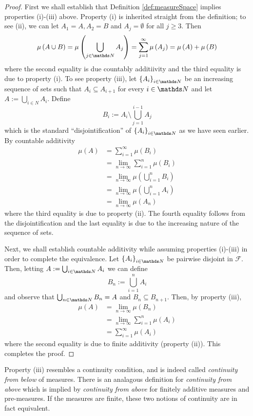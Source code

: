 \begin{proof}
First we shall establish that Definition \ref{def:measureSpace} implies
properties (i)-(iii) above. Property (i) is inherited straight from
the definition; to see (ii), we can let $A_{1}=A,A_{2}=B$ and $A_{j}=\emptyset$
for all $j\geq3$. Then
\[
\mu\left(A\cup B\right)=\mu\left(\bigcup_{j\in\N}A_{j}\right)=\sum_{j=1}^{\infty}\mu\left(A_{j}\right)=\mu\left(A\right)+\mu\left(B\right)
\]
where the second equality is due countably additiivity and the third
equality is due to property (i). To see property (iii), let $\left\{ A_{i}\right\} _{i\in\N}$
be an increasing sequence of sets such that $A_{i}\subseteq A_{i+1}$
for every $i\in\N$ and let $A:=\bigcup_{i\in N}A_{i}$. Define 
\[
B_{i}:=A_{i}\setminus\bigcup_{j=1}^{i-1}A_{j}
\]
which is the standard ``disjointification'' of $\left\{ A_{i}\right\} _{i\in\N}$
as we have seen earlier. By countable additivity
\begin{align*}
\mu\left(A\right) & =\sum_{i=1}^{\infty}\mu\left(B_{i}\right)\\
 & =\lim_{n\to\infty}\sum_{i=1}^{n}\mu\left(B_{i}\right)\\
 & =\lim_{n\to\infty}\mu\left(\bigcup_{i=1}^{n}B_{i}\right)\\
 & =\lim_{n\to\infty}\mu\left(\bigcup_{i=1}^{n}A_{i}\right)\\
 & =\lim_{n\to\infty}\mu\left(A_{n}\right)
\end{align*}
where the third equality is due to property (ii). The fourth equality
follows from the disjointification and the last equality is due to
the increasing nature of the sequence of sets.

Next, we shall establish countable additivity while assuming properties
(i)-(iii) in order to complete the equivalence. Let $\left\{ A_{i}\right\} _{i\in\N}$
be pairwise disjoint in $\mathcal{F}$. Then, letting $A:=\bigcup_{i\in\N}A_{i}$
we can define
\[
B_{n}:=\bigcup_{i=1}^{n}A_{i}
\]
and observe that $\bigcup_{n\in\N}B_{n}=A$ and $B_{n}\subseteq B_{n+1}.$
Then, by property (iii), 
\begin{align*}
\mu\left(A\right) & =\lim_{n\to\infty}\mu\left(B_{n}\right)\\
 & =\lim_{n\to\infty}\sum_{i=1}^{n}\mu\left(A_{i}\right)\\
 & =\sum_{i=1}^{\infty}\mu\left(A_{i}\right)
\end{align*}
where the second equality is due to finite additivity (property (ii)).
This completes the proof.
\end{proof}
\begin{rem*}
Property (iii) resembles a continuity condition, and is indeed called
\emph{continuity from below }of measures. There is an analagous definition
for \emph{continuity from above} which is implied by \emph{continuity
from above }for finitely additive measures and pre-measures. If the
measures are finite, these two notions of continuity are in fact equivalent.
\end{rem*}
